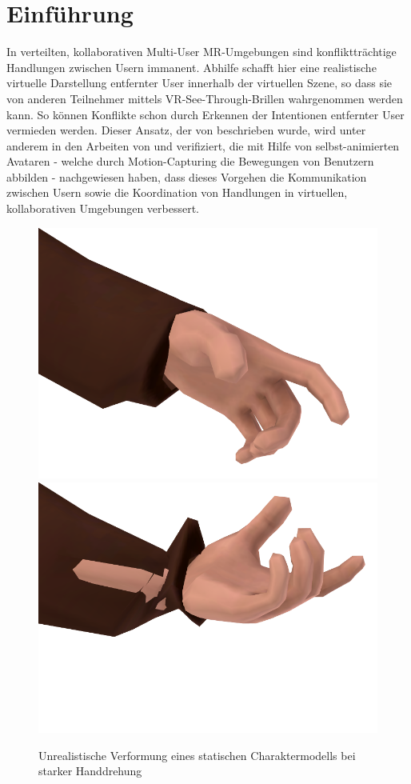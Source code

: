 \section{Einführung}
\label{sec:user_reconstruction}


In verteilten, kollaborativen Multi-User MR-Umgebungen sind konfliktträchtige 
Handlungen zwischen Usern immanent. Abhilfe schafft hier eine realistische 
virtuelle Darstellung entfernter User innerhalb der virtuellen Szene, so dass 
sie von anderen Teilnehmer mittels VR-See-Through-Brillen wahrgenommen werden 
kann. So können Konflikte schon durch Erkennen der Intentionen entfernter User 
vermieden werden. Dieser Ansatz, der von \cite{Cassell:2000:ECI:332051.332075} 
beschrieben wurde, wird unter anderem in den Arbeiten von \cite{mcmanus2011influence} und \cite{dodds2011talk} verifiziert, die mit Hilfe von selbst-animierten Avataren 
- welche durch Motion-Capturing die Bewegungen von Benutzern abbilden - 
nachgewiesen haben, dass dieses Vorgehen die Kommunikation zwischen Usern sowie 
die Koordination von Handlungen in virtuellen, kollaborativen Umgebungen 
verbessert.

\begin{figure}[H]
	\centering
	\includegraphics[width=.3\textwidth]{figs/anim-ok}
	\includegraphics[width=.3\textwidth]{figs/anim-prob}
	\caption{Unrealistische Verformung eines statischen Charaktermodells bei 
	starker Handdrehung}
	\label{fig:animationproblem}
\end{figure}

